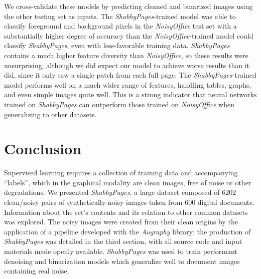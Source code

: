 \documentclass[runningheads]{llncs}
\begin{document}
\begin{table}[]
    \centering
    \caption{Document image binarization performance of a NAFNet model trained and tested on \emph{ShabbyPages} and \emph{NoisyOffice}.}
    \label{tab:binarization_results}
\end{table}

We cross-validate these models by predicting cleaned and binarized images using the other testing set as inputs.
The \emph{ShabbyPages}-trained model was able to classify foreground and background pixels in the \emph{NoisyOffice} test set with a substantially higher degree of accuracy than the \emph{NoisyOffice}-trained model could classify \emph{ShabbyPages}, even with less-favorable training data.
\emph{ShabbyPages} contains a much higher feature diversity than \emph{NoisyOffice}, so these results were unsurprising, although we did expect our model to achieve worse results than it did, since it only saw a single patch from each full page.
The \emph{ShabbyPages}-trained model performs well on a much wider range of features, handling tables, graphs, and even simple images quite well.
This is a strong indicator that neural networks trained on \emph{ShabbyPages} can outperform those trained on \emph{NoisyOffice} when generalizing to other datasets.

\section{Conclusion}
Supervised learning requires a collection of training data and accompanying ``labels'', which in the graphical modality are clean images, free of noise or other degradations.
We presented \emph{ShabbyPages}, a large dataset composed of 6202 clean/noisy pairs of synthetically-noisy images taken from 600 digital documents.
Information about the set's contents and its relation to other common datasets was explored.
The noisy images were created from their clean origins by the application of a pipeline developed with the \emph{Augraphy} library; the production of \emph{ShabbyPages} was detailed in the third section, with all source code and input materials made openly available.
\emph{ShabbyPages} was used to train performant denoising and binarization models which generalize well to document images containing real noise.



\end{document}

